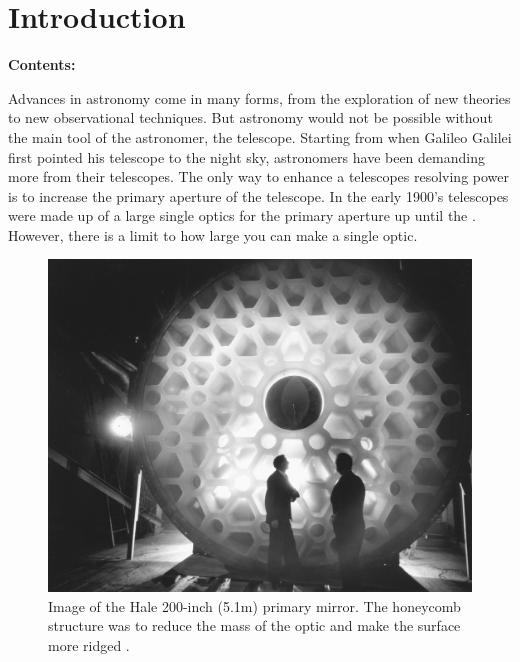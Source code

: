 
\chapter{Introduction} %

\noindent\textbf{\large Contents:}

\noindent\hrulefill
\noindent\startcontents[chapters]
\noindent{}
\noindent\hrulefill

\label{Chapter1} %

Advances in astronomy come in many forms, from the exploration of new theories to new observational techniques.
But astronomy would not be possible without the main tool of the astronomer, the telescope.  Starting from when
Galileo Galilei first pointed his telescope to the night sky, astronomers have been demanding more from their
telescopes.  The only way to enhance a telescopes resolving power is to increase the primary aperture of the
telescope.  In the early 1900's telescopes were made up of a large single optics for the primary aperture up until the . 
However, there is a limit to how large you can make a single optic.  


\begin{figure}[H]
\centering
\includegraphics[width=12 cm]{../Figures/twomen}
\caption{Image of the Hale 200-inch (5.1m) primary mirror.  The honeycomb structure was to reduce the mass of the optic and make the surface more ridged \cite{ExhibitionsGlass}.}
\label{fig:hale}
\end{figure}


